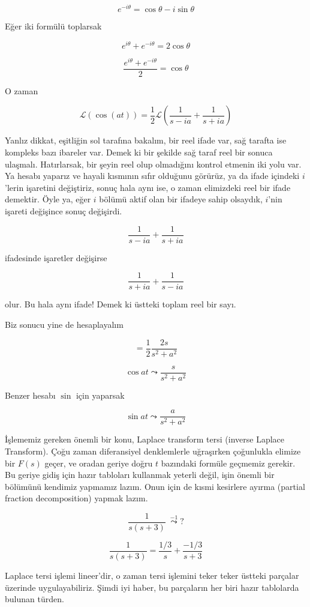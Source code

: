 \documentclass[12pt,fleqn]{article}\usepackage{../../common}
\begin{document}
$$ e^{-i\theta} = \cos\theta - i\sin\theta $$

Eğer iki formülü toplarsak

$$ e^{i\theta} + e^{-i\theta} = 2 \cos\theta $$

$$ \frac{e^{i\theta} + e^{-i\theta}}{2} = \cos\theta $$

O zaman 

$$ \mathcal{L}(\cos(at)) = \frac{1}{2} \mathcal{L} 
(\frac{1}{s-ia} + \frac{1}{s+ia} )
$$

Yanlız dikkat, eşitliğin sol tarafına bakalım, bir reel ifade var, sağ
tarafta ise kompleks bazı ibareler var. Demek ki bir şekilde sağ taraf reel
bir sonuca ulaşmalı. Hatırlarsak, bir şeyin reel olup olmadığını kontrol
etmenin iki yolu var. Ya hesabı yaparız ve hayali kısmının sıfır olduğunu
görürüz, ya da ifade içindeki $i$'lerin işaretini değiştiriz, sonuç hala
aynı ise, o zaman elimizdeki reel bir ifade demektir. Öyle ya, eğer $i$
bölümü aktif olan bir ifadeye sahip olsaydık, $i$'nin işareti değişince
sonuç değişirdi. 

$$ \frac{1}{s-ia} + \frac{1}{s+ia} $$

ifadesinde işaretler değişirse 

$$ \frac{1}{s+ia} + \frac{1}{s-ia} $$

olur. Bu hala aynı ifade! Demek ki üstteki toplam reel bir sayı. 

Biz sonucu yine de hesaplayalım

$$ = \frac{1}{2}\frac{2s}{s^2+a^2} $$

$$ \cos at \leadsto \frac{s}{s^2+a^2} $$

Benzer hesabı $\sin$ için yaparsak 

$$ \sin at \leadsto \frac{a}{s^2 + a^2} $$

İşlememiz gereken önemli bir konu, Laplace transform tersi (inverse Laplace
Transform). Çoğu zaman diferansiyel denklemlerle uğraşırken çoğunlukla elimize
bir $F(s)$ geçer, ve oradan geriye doğru $t$ bazındaki formüle geçmemiz
gerekir. Bu geriye gidiş için hazır tabloları kullanmak yeterli değil, işin
önemli bir bölümünü kendimiz yapmamız lazım. Onun için de kısmi kesirlere ayırma
(partial fraction decomposition) yapmak lazım.

$$ \frac{1}{s(s+3)} \  \stackrel{-1}{\leadsto} ? $$


$$ \frac{1}{s(s+3)} = 
\frac{1/3}{s} + \frac{-1/3}{s+3}
$$

Laplace tersi işlemi lineer'dir, o zaman tersi işlemini teker teker üstteki
parçalar üzerinde uygulayabiliriz. Şimdi iyi haber, bu parçaların her biri
hazır tablolarda bulunan türden. 
\end{document}
